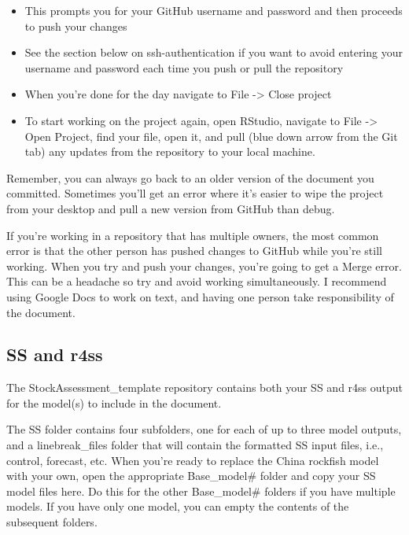 \documentclass[12pt,]{article}
\providecommand{\tightlist}{%
  \setlength{\itemsep}{0pt}\setlength{\parskip}{0pt}}
\begin{document}
\begin{enumerate}
  \begin{itemize}
  \tightlist
  \item
    This prompts you for your GitHub username and password and then
    proceeds to push your changes
  \item
    See the section below on ssh-authentication if you want to avoid
    entering your username and password each time you push or pull the
    repository
  \item
    When you're done for the day navigate to File -\textgreater{} Close
    project
  \item
    To start working on the project again, open RStudio, navigate to
    File -\textgreater{} Open Project, find your file, open it, and pull
    (blue down arrow from the Git tab) any updates from the repository
    to your local machine.
  \end{itemize}
\end{enumerate}

Remember, you can always go back to an older version of the document you
committed. Sometimes you'll get an error where it's easier to wipe the
project from your desktop and pull a new version from GitHub than debug.

If you're working in a repository that has multiple owners, the most
common error is that the other person has pushed changes to GitHub while
you're still working. When you try and push your changes, you're going
to get a Merge error. This can be a headache so try and avoid working
simultaneously. I recommend using Google Docs to work on text, and
having one person take responsibility of the document.

\subsection{SS and r4ss}\label{ss-and-r4ss}

The StockAssessment\_template repository contains both your SS and r4ss
output for the model(s) to include in the document.

The SS folder contains four subfolders, one for each of up to three
model outputs, and a linebreak\_files folder that will contain the
formatted SS input files, i.e., control, forecast, etc. When you're
ready to replace the China rockfish model with your own, open the
appropriate Base\_model\# folder and copy your SS model files here. Do
this for the other Base\_model\# folders if you have multiple models. If
you have only one model, you can empty the contents of the subsequent
folders.
\end{document}
